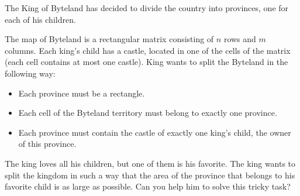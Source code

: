 The King of Byteland has decided to divide the country into provinces, one for each of his children.

The map of Byteland is a rectangular matrix consisting of $n$ rows and $m$ columns. Each king's child has a castle, located in one of the cells of the matrix (each cell contains at most one castle). King wants to split the Byteland in the following way:
\begin{itemize}
\item Each province must be a rectangle.
\item Each cell of the Byteland territory must belong to exactly one province.
\item Each province must contain the castle of exactly one king's child, the owner of this province.
\end{itemize}

The king loves all his children, but one of them is his favorite. The king wants to split the kingdom in such a way that the area of the province that belongs to his favorite child is as large as possible. Can you help him to solve this tricky task?